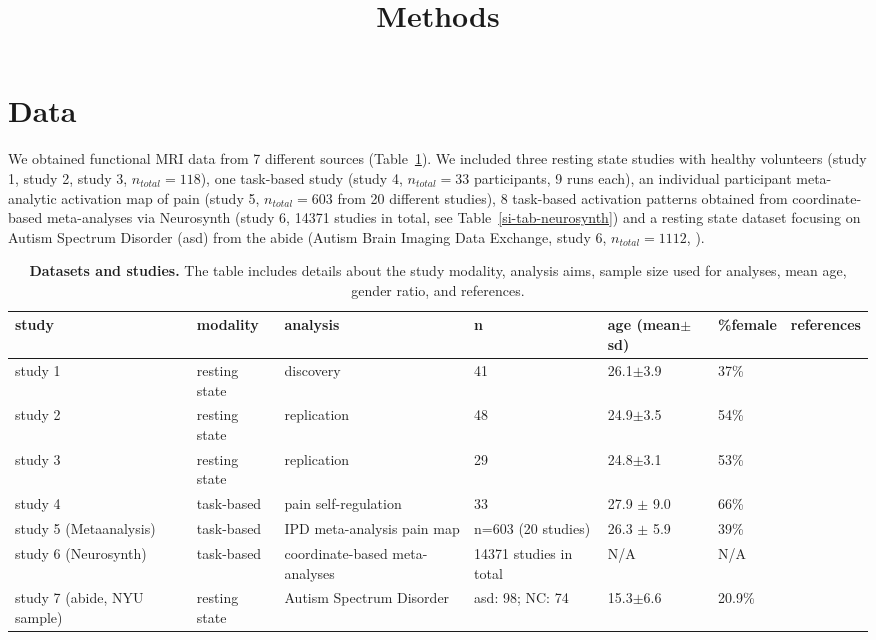\documentclass{article}
\title{Methods}
\date{\displaydate{articleDate}}
\author{}
\begin{document}
\maketitle


\keywords{}

\section{Data}

We obtained functional MRI data from 7 different sources (Table~\ref{tab-samples}).
We included three resting state studies with healthy volunteers (study 1, study 2, study 3, $n_{total}=118$), one task-based study (study 4, $n_{total}=33$ participants, 9 runs each), an individual participant meta-analytic activation map of pain (study 5, $n_{total}=603$ from 20 different studies), 8 task-based activation patterns obtained from coordinate-based meta-analyses via Neurosynth (study 6, 14371 studies in total, see Table~\ref{si-tab-neurosynth}) and a resting state dataset focusing on Autism Spectrum Disorder (\acrshort{asd}) from the \acrshort{abide} (Autism Brain Imaging Data Exchange, study 6, $n_{total}=1112$, \cite{di2014autism}).

\begin{table}
\centering
\caption[]{\textbf{Datasets and studies.} The table includes details about the study modality, analysis aims, sample size used for analyses, mean age, gender ratio, and references.}
\label{tab-samples}
\begin{tabular}{p{}p{}p{}p{}p{}p{}p{}}
\toprule
study & modality & analysis & n & age (mean$\pm$sd) & \%female & references \\
\hline
study 1 & resting state & discovery & 41 & 26.1$\pm$3.9 & 37\% & \cite{Spisak_2020} \\
study 2 & resting state & replication & 48 & 24.9$\pm$3.5 & 54\% & \cite{Spisak_2020} \\
study 3 & resting state & replication & 29 & 24.8$\pm$3.1 & 53\% & \cite{Spisak_2020} \\
study 4 & task-based & pain self-regulation & 33 & 27.9 $\pm$ 9.0 & 66\% & \cite{Woo_2015} \\
study 5 (Metaanalysis) & task-based & IPD meta-analysis pain map & n=603 (20 studies) & 26.3 $\pm$ 5.9 & 39\% & \cite{zunhammer2021meta} \\
study 6 (Neurosynth) & task-based & coordinate-based meta-analyses & 14371 studies in total & N/A & N/A & \cite{Yarkoni_2011} \\
study 7 (\acrshort{abide}, NYU sample) & resting state & Autism Spectrum Disorder & \acrshort{asd}: 98; NC: 74 & 15.3$\pm$6.6 & 20.9\% & \cite{di2014autism} \\
\bottomrule
\end{tabular}
\end{table}
\end{document}
